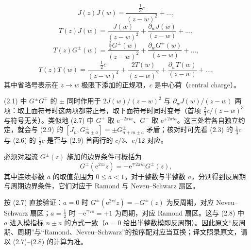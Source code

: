\begin{equation}\tag{2.3}
J(z)J(w)=\frac{\frac{1}{3}c}{(z-w)^{2}}+\ldots,
\end{equation}
\begin{equation}\tag{2.4}
T(z)J(w)=\frac{J(w)}{(z-w)^{2}}+\frac{\partial_{w}J(w)}{(z-w)}+\ldots,
\end{equation}
\begin{equation}\tag{2.5}
T(z)G^{\pm}(w)=\frac{\frac{3}{2}G^{\pm}(w)}{(z-w)^{2}}+\frac{\partial_{w}G^{\pm}(w)}{(z-w)}+\ldots,
\end{equation}
\begin{equation}\tag{2.6}
T(z)T(w)=\frac{\frac{1}{2}c}{(z-w)^{4}}+\frac{2T(w)}{(z-w)^{2}}+\frac{\partial_{w}T(w)}{(z-w)}+\ldots,
\end{equation}
其中省略号表示在 $z\to w$ 极限下添加的正规项，$c$ 是中心荷（central charge）。

\begin{yizhu}[易错点]
(2.1) 中 $G^{\pm}G^{\mp}$ 的 $\pm$ 同时作用于 $2J(w)/(z-w)^{2}$ 与 $\partial_{w}J(w)/(z-w)$ 两项：取上面符号时这两项都带正号，取下面符号时同时变号（首项 $\frac{2}{3}c/(z-w)^{3}$ 与符号无关）。类似地 (2.7) 中 $G^{+}$ 取 $\mathrm{e}^{-2\pi ia}$、$G^{-}$ 取 $\mathrm{e}^{+2\pi ia}$。这三处若各自独立约定，就会与 (2.9) 的 $[J_{n},G^{\pm}_{m\pm a}]=\pm G^{\pm}_{n+m\pm a}$ 矛盾；核对时可先看 (2.3) 的 $\frac{1}{3}c$ 与 (2.6) 的 $\frac{1}{2}c$ 是否与 (2.9) 首两行的 $c/3$、$c/12$ 对应。
\end{yizhu}

必须对超流 $G^{\pm}(z)$ 施加的边界条件可概括为
\begin{equation}\tag{2.7}
G^{\pm}(\mathrm{e}^{2\pi i}z)=-\mathrm{e}^{\mp 2\pi ia}G^{\pm}(z),
\end{equation}
其中连续参数 $a$ 的取值范围为 $0\le a<1$。对于整数与半整数 $a$，分别得到反周期与周期边界条件，它们对应于 Ramond 与 Neveu--Schwarz 扇区。

\begin{yizhu}[原文疑误]
按 (2.7) 直接验证：$a=0$ 时 $G^{\pm}(\mathrm{e}^{2\pi i}z)=-G^{\pm}(z)$ 为反周期，对应 Neveu--Schwarz 扇区；$a=\frac{1}{2}$ 时 $-\mathrm{e}^{\mp i\pi}=+1$ 为周期，对应 Ramond 扇区。这与 (2.8) 中 $a$ 进入模指标 $n\pm a$ 的方式一致（$a=0$ 给出半整数模即反周期）。因此原文“反周期、周期”与“Ramond、Neveu--Schwarz”的按序配对应当互换；译文照录原文，请以 (2.7)--(2.8) 的计算为准。
\end{yizhu}

